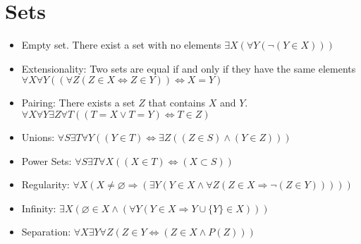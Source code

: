 \documentclass[11pt, twocolumn]{article}
\newenvironment{compactitem}
{\begin{itemize}
  \setlength{\itemsep}{1px}
  \setlength{\parskip}{0pt}
  \setlength{\parsep}{0pt}}
{\end{itemize}}
\begin{document}
\section{Sets}
\begin{compactitem}
\item Empty set. There exist a set with no elements $\exists X (\forall Y(\neg(Y\in X)))$
\item Extensionality: Two sets are equal if and only if they have the same elements $\forall X\forall Y ((\forall Z(Z \in X \Leftrightarrow Z\in Y)) \Leftrightarrow X=Y)$
\item Pairing: There exists a set $Z$ that contains $X$ and $Y$. $\forall X \forall Y \exists Z \forall T ((T=X\vee T=Y)\Leftrightarrow T\in Z)$
\item Unions: $\forall S \exists T \forall Y ((Y\in T)\Leftrightarrow \exists Z((Z\in S)\wedge (Y\in Z)))$
\item Power Sets: $\forall S \exists T \forall X (( X\in T) \Leftrightarrow (X\subset S))$
\item Regularity: $\forall X (X \neq \varnothing \Rightarrow (\exists Y (Y \in X \wedge \forall Z (Z\in X \Rightarrow \neg (Z\in Y)))))$
\item Infinity: $\exists X(\varnothing \in X \wedge (\forall Y (Y\in X \Rightarrow Y\cup \{ Y \} \in X )))$
\item Separation: $ \forall X \exists Y \forall Z (Z\in Y \Leftrightarrow (Z\in X \wedge P(Z)))$
\end{compactitem}
\end{document}
